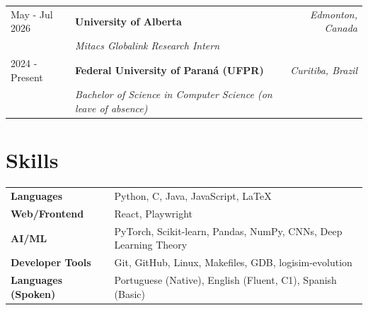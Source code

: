 \documentclass[a4paper,12pt]{article}
\begin{document}
\begin{tabularx}{\linewidth}{@{}l X r@{}}
May - Jul 2026 & \textbf{University of Alberta} & \textit{Edmonton, Canada} \\
& \textit{Mitacs Globalink Research Intern} & \\[4pt]
2024 - Present & \textbf{Federal University of Paraná (UFPR)} & \textit{Curitiba, Brazil} \\
& \textit{Bachelor of Science in Computer Science (on leave of absence)} & \\
\end{tabularx}

\section{Skills}

\begin{tabularx}{\linewidth}{@{}l X@{}}
\textbf{Languages} & Python, C, Java, JavaScript, LaTeX \\
\textbf{Web/Frontend} & React, Playwright \\
\textbf{AI/ML} & PyTorch, Scikit-learn, Pandas, NumPy, CNNs, Deep Learning Theory \\
\textbf{Developer Tools} & Git, GitHub, Linux, Makefiles, GDB, logisim-evolution \\
\textbf{Languages (Spoken)} & Portuguese (Native), English (Fluent, C1), Spanish (Basic)\\
\end{tabularx}

\vfill
{}
\end{document}
